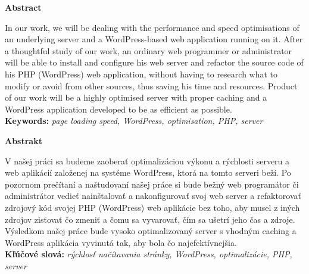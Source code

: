 \newpage
 {\noindent\large\bf Abstract}
  \vspace{1.8cm}
 

In our work, we will be dealing with the performance and speed optimisations
of an underlying server and a WordPress-based web application running on
it. After a thoughtful study of our work, an ordinary web programmer or
administrator will be able to install and configure his web server and refactor
the source code of his PHP (WordPress) web application, without having to
research what to modify or avoid from other sources, thus saving his time and
resources. Product of our work will be a highly optimised server with proper
caching and a WordPress application developed to be as efficient as possible.
\\

{\parindent0pt \textbf{Keywords:} \emph{page loading speed, WordPress, optimisation, PHP, server}}


\newpage

{\noindent\large\bf Abstrakt}

\vspace{1.8cm}

V našej práci sa budeme zaoberať optimalizáciou výkonu a rýchlosti serveru a web aplikácií založenej na systéme WordPress, ktorá na tomto serveri beží. Po pozornom prečítaní a naštudovaní našej práce si bude bežný web programátor či administrátor vedieť nainštalovať a nakonfigurovať svoj web server a refaktorovať zdrojový kód svojej PHP (WordPress) web aplikácie bez toho, aby musel z iných zdrojov zisťovať čo zmeniť a čomu sa vyvarovať, čím sa ušetrí jeho čas a zdroje. Výsledkom našej práce bude vysoko optimalizovaný server s vhodným caching a WordPress aplikácia vyvinutá tak, aby bola čo najefektívnejšia.
\\

{\parindent0pt \textbf{Kľúčové slová:} \emph{rýchlosť načítavania stránky, WordPress, optimalizácie, PHP, server}} 